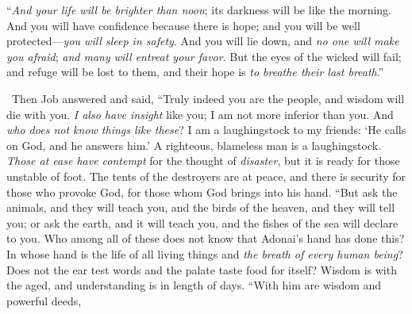 \begin{biblechapter}
\verse “\textit{And your life will be brighter than noon}; 
its darkness will be like the morning.
\verse And you will have confidence because there is hope; 
and you will be well protected—\textit{you will sleep in safety}.
\verse And you will lie down, and \textit{no one will make you afraid}; 
\textit{and many will entreat your favor}.
\verse But the eyes of the wicked will fail; 
and refuge will be lost to them, 
and their hope is \textit{to breathe their last breath}.”
\end{biblechapter}

\begin{biblechapter} %
  Then Job answered and said,
\verse “Truly indeed you are the people, 
and wisdom will die with you.
\verse \textit{I also have insight} like you; 
I am not more inferior than you. 
And \textit{who does not know things like these}?
\verse I am a laughingstock to my friends: 
‘He calls on God, and he answers him.’ 
A righteous, blameless man is a laughingstock.
\verse \textit{Those at ease have contempt} for the thought of \textit{disaster}, 
but it is ready for those unstable of foot.
\verse The tents of the destroyers are at peace, 
and there is security for those who provoke God, 
for those whom God brings into his hand.
\verse “But ask the animals, and they will teach you, 
and the birds of the heaven, and they will tell you;
\verse or ask the earth, and it will teach you, 
and the fishes of the sea will declare to you.
\verse Who among all of these does not know 
that Adonai’s hand has done this?
\verse In whose hand is the life of all living things 
and \textit{the breath of every human being}?
\verse Does not the ear test words 
and the palate taste food for itself?
\verse Wisdom is with the aged, 
and understanding is in length of days.
\verse “With him are wisdom and powerful deeds, 

\end{biblechapter}
